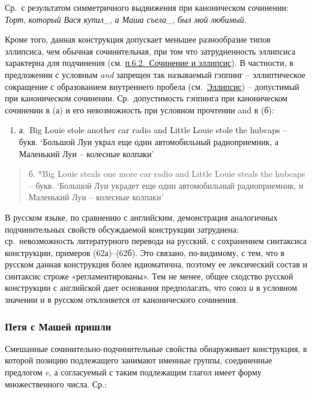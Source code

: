 Ср.~с результатом симметричного выдвижения при каноническом сочинении:
\emph{Торт}, \emph{который Вася купил\_}, \emph{а Маша съела\_},
\emph{был мой любимый}.

Кроме того, данная конструкция допускает меньшее разнообразие типов
эллипсиса, чем обычная сочинительная, при том что затрудненность
эллипсиса характерна для подчинения (см. \underline{п.6.2.~Сочинение и
эллипсис}). В частности, в предложении с условным \emph{and} запрещен
так называемый гэппинг -- эллиптическое сокращение с образованием
внутреннего пробела (см.~\underline{Эллипсис}) -- допустимый при
каноническом сочинении. Ср.~допустимость гэппинга при каноническом
сочинении в (а) и его невозможность при условном прочтении and в (б):

\begin{enumerate}
\def\labelenumi{(\arabic{enumi})}
\setcounter{enumi}{61}
\item
  а.~Big Louie stole another car radio and Little Louie stole the
  hubcaps -- букв. `Большой Луи украл еще один автомобильный
  радиоприемник, а Маленький Луи -- колесные колпаки'
\end{enumerate}

\begin{quote}
б. *Big Louie steals one more car radio and Little Louie steals the
hubcaps -- букв. `Большой Луи украдет еще один автомобильный
радиоприемник, и Маленький Луи -- колесные колпаки'
\end{quote}

В русском языке, по сравнению с английским, демонстрация аналогичных
подчинительных свойств обсуждаемой конструкции затруднена:
ср.~невозможность литературного перевода на русский, с сохранением
синтаксиса конструкции, примеров (62а)--(62б). Это связано, по-видимому,
с тем, что в русском данная конструкция более идиоматична, поэтому ее
лексический состав и синтаксис строже «регламентированы». Тем не менее,
общее сходство русской конструкции с английской дает основания
предполагать, что союз \emph{и} в условном значении и в русском
отклоняется от канонического сочинения.

\hypertarget{ux43fux435ux442ux44f-ux441-ux43cux430ux448ux435ux439-ux43fux440ux438ux448ux43bux438}{%
\subsubsection{Петя с Машей
пришли}\label{ux43fux435ux442ux44f-ux441-ux43cux430ux448ux435ux439-ux43fux440ux438ux448ux43bux438}}

Смешанные сочинительно-подчинительные свойства обнаруживает конструкция,
в которой позицию подлежащего занимают именные группы, соединенные
предлогом \emph{c}, а согласуемый с таким подлежащим глагол имеет форму
множественного числа. Ср.:

